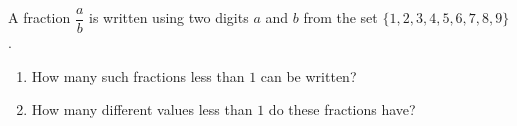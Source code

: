 A fraction $\dfrac {a}{b}$ is written using two digits $a$ and $b$ from the set $\{1,2,3,4,5,6,7,8,9\}$.
\begin{enumerate}
\item[(a)] How many such fractions less than $1$ can be written?
\item[(b)] How many different values less than $1$ do these fractions have?
\end{enumerate}
